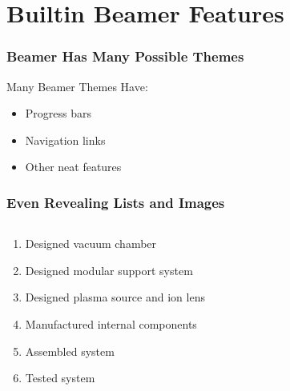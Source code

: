 \documentclass{beamer}
\begin{document}
    \section{Builtin Beamer Features}
        \begin{frame}
            \frametitle{Beamer Has Many Possible Themes}
            Many Beamer Themes Have:
            \begin{itemize}
                \item<1-> Progress bars
                \item<2-> Navigation links
                \item<3-> Other neat features
            \end{itemize}
        \end{frame}
        \begin{frame}
            \frametitle{Even Revealing Lists and Images}
            \begin{columns}[T]
                \begin{column}{0.5\textwidth}
                    \begin{enumerate}
                        \item<1-> Designed vacuum chamber
                        \item<2-> Designed modular support system
                        \item<3-> Designed plasma source and ion lens
                        \item<4-> Manufactured internal components
                        \item<5-> Assembled system
                        \item<6-> Tested system
                    \end{enumerate}
                \end{column}
                \begin{column}{0.5\textwidth}
                \end{column}
            \end{columns}
        \end{frame}
\end{document}

